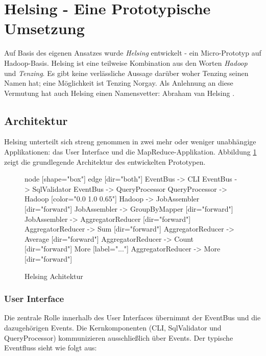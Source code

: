 \documentclass[a4paper]{article}
\begin{document}
\newpage

\section{Helsing - Eine Prototypische Umsetzung}
\label{sec:prototype}

Auf Basis des eigenen Ansatzes wurde \textit{Helsing} entwickelt - ein Micro-Prototyp auf Hadoop-Basis. Helsing ist eine teilweise Kombination aus den Worten \textit{Hadoop} und \textit{Tenzing}. Es gibt keine verlässliche Aussage darüber woher Tenzing seinen Namen hat; eine Möglichkeit ist Tenzing Norgay\cite{TenzingNorgay}. Als Anlehnung an diese Vermutung hat auch Helsing einen Namensvetter: Abraham van Helsing \cite{Helsing}.

\subsection{Architektur}
Helsing unterteilt sich streng genommen in zwei mehr oder weniger unabhängige Applikationen: das User Interface und die MapReduce-Applikation. Abbildung \ref{fig:helsing-architecture} zeigt die grundlegende Architektur des entwickelten Prototypen.

\begin{figure}[H]
\centering
{} {
    node [shape="box"]
    edge [dir="both"]
    EventBus -> CLI
    EventBus -> SqlValidator
    EventBus -> QueryProcessor
    QueryProcessor -> Hadoop [color="0.0 1.0 0.65"]
    Hadoop -> JobAssembler [dir="forward"]
    JobAssembler -> GroupByMapper [dir="forward"]
    JobAssembler -> AggregatorReducer [dir="forward"]
    AggregatorReducer -> Sum [dir="forward"]
    AggregatorReducer -> Average [dir="forward"]
    AggregatorReducer -> Count [dir="forward"]
    More [label="..."]
    AggregatorReducer -> More [dir="forward"]
}
\caption{Helsing Achitektur}
\label{fig:helsing-architecture}
\end{figure}

\subsubsection{User Interface}
Die zentrale Rolle innerhalb des User Interfaces übernimmt der EventBus und die dazugehörigen Events. Die Kernkomponenten (CLI, SqlValidator und QueryProcessor) kommunizieren ausschließlich über Events. Der typische Eventfluss sieht wie folgt aus:
\end{document}
